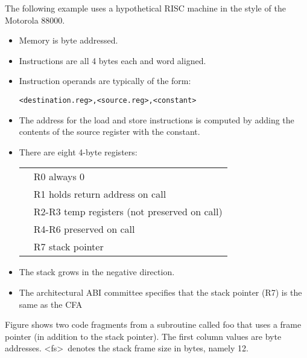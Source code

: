The following example uses a hypothetical RISC machine in
the style of the Motorola 88000.
\begin{itemize}
\item Memory is byte addressed.

\item Instructions are all 4 bytes each and word aligned.

\item Instruction operands are typically of the form:
\begin{alltt}
    <destination.reg>, <source.reg>, <constant>
\end{alltt}

\item The address for the load and store instructions is computed
by adding the contents of the
source register with the constant.

\item There are eight 4-byte registers:
\par
\begin{nolinenumbersenv}
\begin{tabular}{p{5mm}l}
   & R0 always 0 \\
   & R1 holds return address on call \\
   & R2-R3 temp registers (not preserved on call) \\
   & R4-R6 preserved on call \\
   & R7 stack pointer \\
\end{tabular}
\end{nolinenumbersenv}

\item  The stack grows in the negative direction.

\item The architectural ABI committee specifies that the
stack pointer (R7) is the same as the CFA

\end{itemize}

Figure 
shows two code fragments from a subroutine called
foo that uses a frame pointer (in addition to the stack
pointer). The first column values are byte addresses. 
\textless fs\textgreater\ denotes the stack frame size in bytes, namely 12.


